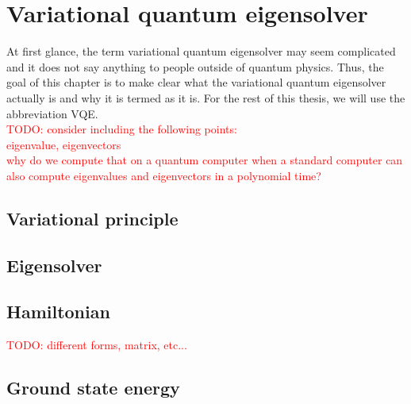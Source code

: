 \chapter{Variational quantum eigensolver}\label{ch:vqe}
At first glance, the term variational quantum eigensolver may seem complicated and it does not say anything to people outside of quantum physics. Thus, the goal of this chapter is to make clear what the variational quantum eigensolver actually is and why it is termed as it is. For the rest of this thesis, we will use the abbreviation VQE.\\
\textcolor{red}{TODO: consider including the following points:\\ eigenvalue, eigenvectors \\ why do we compute that on a quantum computer when a standard computer can also compute eigenvalues and eigenvectors in a polynomial time? }

\section{Variational principle}
\section{Eigensolver}
\section{Hamiltonian}
\textcolor{red}{TODO: different forms, matrix, etc...}

\section{Ground state energy}